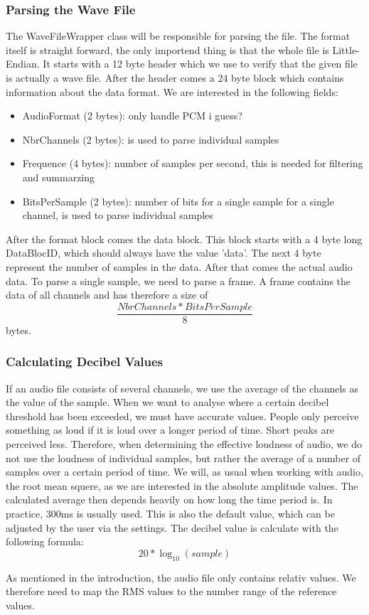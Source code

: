 \subsubsection{Parsing the Wave File}
The WaveFileWrapper class will be responsible for parsing the file. The format itself is straight forward\cite{wav_file_format_wikipedia}, the only importend thing is that the whole file is Little-Endian. It starts with a 12 byte header which we use to verify that the given file is actually a wave file. After the header comes a 24 byte block which contains information about the data format. We are interested in the following fields:
\begin{itemize}
    \item AudioFormat (2 bytes): only handle PCM i guess?
    \item NbrChannels (2 bytes): is used to parse individual samples
    \item Frequence (4 bytes): number of samples per second, this is needed for filtering and summarzing 
    \item BitsPerSample (2 bytes): number of bits for a single sample for a single channel, is used to parse individual samples
\end{itemize}
After the format block comes the data block. This block starts with a 4 byte long DataBlocID, which should always have the value 'data'. The next 4 byte represent the number of samples in the data. After that comes the actual audio data. To parse a single sample, we need to parse a frame. A frame contains the data of all channels and has therefore a size of \[\frac{NbrChannels * BitsPerSample}{8}\] bytes. 

\subsubsection{Calculating Decibel Values}
If an audio file consists of several channels, we use the average of the channels as the value of the sample.
When we want to analyse where a certain decibel threshold has been exceeded, we must have accurate values. People only perceive something as loud if it is loud over a longer period of time. Short peaks are perceived less. Therefore, when determining the effective loudness of audio, we do not use the loudness of individual samples, but rather the average of a number of samples over a certain period of time. We will, as usual when working with audio, the root mean squere, as we are interested in the absolute amplitude values.
The calculated average then depends heavily on how long the time period is. In practice, 300ms is usually used\cite{timespan_for_audio_rms_calculate}. This is also the default value, which can be adjusted by the user via the settings.
The decibel value is calculate with the following formula\cite{decibel_wikipedia}:
\[20 * \log_{10} (sample)\] 

As mentioned in the introduction, the audio file only contains relativ values. We therefore need to map the RMS values to the number range of the reference values.
